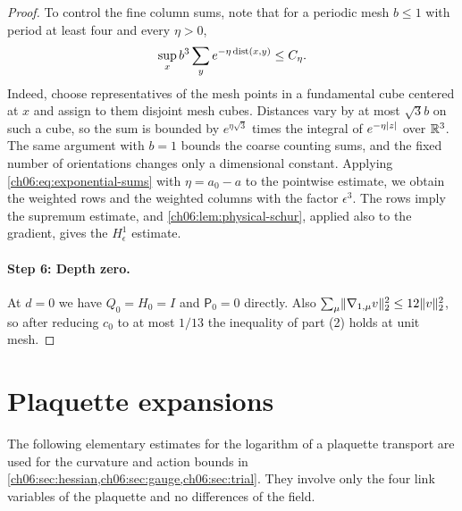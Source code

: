 \begin{proof}
To control the fine column sums, note that for a periodic mesh $b\le1$ with period at least four and every $\eta>0$,
\begin{equation}\label{ch06:eq:exponential-sums}
 \sup_xb^3\sum_ye^{-\eta\operatorname{dist}(x,y)}\le C_\eta.
\end{equation}
Indeed, choose representatives of the mesh points in a fundamental cube centered at $x$ and assign to them disjoint mesh cubes. Distances vary by at most $\sqrt3b$ on such a cube, so the sum is bounded by $e^{\eta\sqrt3}$ times the integral of $e^{-\eta\lvert z\rvert}$ over $\mathbb R^3$. The same argument with $b=1$ bounds the coarse counting sums, and the fixed number of orientations changes only a dimensional constant. Applying \eqref{ch06:eq:exponential-sums} with $\eta=a_0-a$ to the pointwise estimate, we obtain the weighted rows and the weighted columns with the factor $\epsilon^3$. The rows imply the supremum estimate, and \cref{ch06:lem:physical-schur}, applied also to the gradient, gives the $H^1_\epsilon$ estimate.

\paragraph{Step 6: Depth zero.}
At $d=0$ we have $Q_0=H_0=I$ and $\mathsf P_0=0$ directly. Also $\sum_\mu\lVert \nabla_{1,\mu}v\rVert_2^2\le12\lVert v\rVert_2^2$, so after reducing $c_0$ to at most $1/13$ the inequality of part (2) holds at unit mesh.
\end{proof}

\section{Plaquette expansions}\label{ch06:sec:plaquette}

The following elementary estimates for the logarithm of a plaquette transport are used for the curvature and action bounds in \cref{ch06:sec:hessian,ch06:sec:gauge,ch06:sec:trial}. They involve only the four link variables of the plaquette and no differences of the field.

